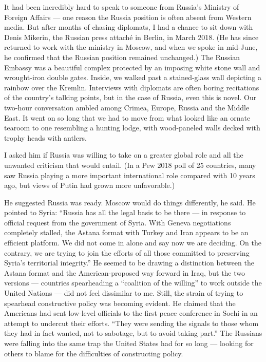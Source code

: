 It had been incredibly hard to speak to someone from Russia's Ministry
of Foreign Affairs --- one reason the Russia position is often absent
from Western media. But after months of chasing diplomats, I had a
chance to sit down with Denis Mikerin, the Russian press attaché in
Berlin, in March 2018. (He has since returned to work with the ministry
in Moscow, and when we spoke in mid-June, he confirmed that the Russian
position remained unchanged.) The Russian Embassy was a beautiful
complex protected by an imposing white stone wall and wrought-iron
double gates. Inside, we walked past a stained-glass wall depicting a
rainbow over the Kremlin. Interviews with diplomats are often boring
recitations of the country's talking points, but in the case of Russia,
even this is novel. Our two-hour conversation ambled among Crimea,
Europe, Russia and the Middle East. It went on so long that we had to
move from what looked like an ornate tearoom to one resembling a hunting
lodge, with wood-paneled walls decked with trophy heads with antlers.

I asked him if Russia was willing to take on a greater global role and
all the unwanted criticism that would entail. (In a Pew 2018 poll of 25
countries, many saw Russia playing a more important international role
compared with 10 years ago, but views of Putin had grown more
unfavorable.)

He suggested Russia was ready. Moscow would do things differently, he
said. He pointed to Syria: ``Russia has all the legal basis to be there
--- in response to official request from the government of Syria. With
Geneva negotiations completely stalled, the Astana format with Turkey
and Iran appears to be an efficient platform. We did not come in alone
and say now we are deciding. On the contrary, we are trying to join the
efforts of all those committed to preserving Syria's territorial
integrity.'' He seemed to be drawing a distinction between the Astana
format and the American-proposed way forward in Iraq, but the two
versions --- countries spearheading a ``coalition of the willing'' to
work outside the United Nations --- did not feel dissimilar to me.
Still, the strain of trying to spearhead constructive policy was
becoming evident. He claimed that the Americans had sent low-level
officials to the first peace conference in Sochi in an attempt to
undercut their efforts. ``They were sending the signals to those whom
they had in fact wanted, not to sabotage, but to avoid taking part.''
The Russians were falling into the same trap the United States had for
so long --- looking for others to blame for the difficulties of
constructing policy.


